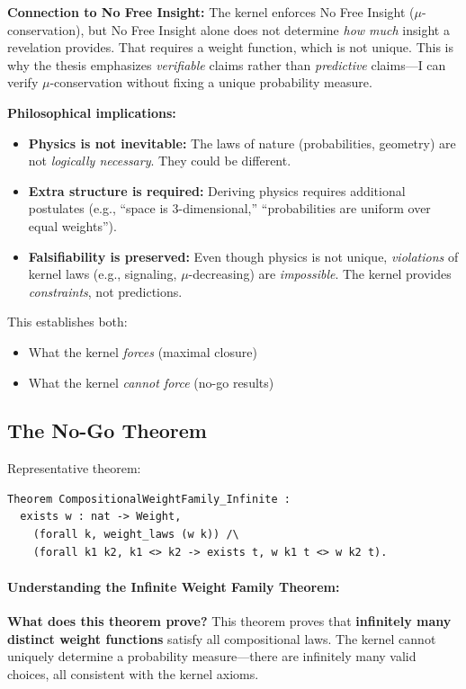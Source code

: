 \textbf{Connection to No Free Insight:} The kernel enforces No Free Insight ($\mu$-conservation), but No Free Insight alone does not determine \textit{how much} insight a revelation provides. That requires a weight function, which is not unique. This is why the thesis emphasizes \textit{verifiable} claims rather than \textit{predictive} claims---I can verify $\mu$-conservation without fixing a unique probability measure.

\textbf{Philosophical implications:}
\begin{itemize}
    \item \textbf{Physics is not inevitable:} The laws of nature (probabilities, geometry) are not \textit{logically necessary}. They could be different.
    \item \textbf{Extra structure is required:} Deriving physics requires additional postulates (e.g., ``space is 3-dimensional,'' ``probabilities are uniform over equal weights'').
    \item \textbf{Falsifiability is preserved:} Even though physics is not unique, \textit{violations} of kernel laws (e.g., signaling, $\mu$-decreasing) are \textit{impossible}. The kernel provides \textit{constraints}, not predictions.
\end{itemize}


This establishes both:
\begin{itemize}
    \item What the kernel \textit{forces} (maximal closure)
    \item What the kernel \textit{cannot force} (no-go results)
\end{itemize}

\subsection{The No-Go Theorem}

Representative theorem:
\begin{lstlisting}
Theorem CompositionalWeightFamily_Infinite :
  exists w : nat -> Weight,
    (forall k, weight_laws (w k)) /\
    (forall k1 k2, k1 <> k2 -> exists t, w k1 t <> w k2 t).
\end{lstlisting}

\paragraph{Understanding the Infinite Weight Family Theorem:}

\textbf{What does this theorem prove?} This theorem proves that \textbf{infinitely many distinct weight functions} satisfy all compositional laws. The kernel cannot uniquely determine a probability measure---there are infinitely many valid choices, all consistent with the kernel axioms.

